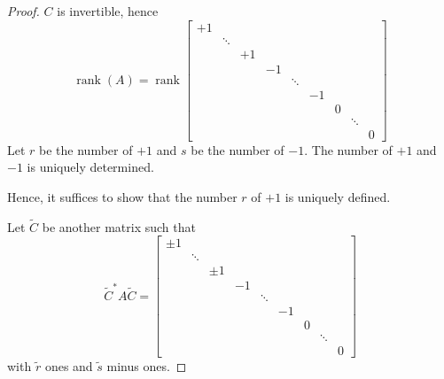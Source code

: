 \documentclass{article}
\begin{document}
\begin{proof}
  $C$ is invertible, hence
  \[
    \operatorname{rank}(A) =
    \operatorname{rank} \begin{bmatrix}
       +1 &        &       &    &        &    &   &        & \\
          & \ddots &       &    &        &    &   &        & \\
          &        &    +1 &    &        &    &   &        & \\
          &        &       & -1 &        &    &   &        & \\
          &        &       &    & \ddots &    &   &        & \\
          &        &       &    &        & -1 &   &        & \\
          &        &       &    &        &    & 0 &        & \\
          &        &       &    &        &    &   & \ddots & \\
          &        &       &    &        &    &   &        & 0
    \end{bmatrix}
  \]
  Let $r$ be the number of $+1$ and $s$ be the number of $-1$.
  The number of $+1$ and $-1$ is uniquely determined.

  Hence, it suffices to show that the number $r$ of $+1$ is uniquely defined.

  Let $\tilde{C}$ be another matrix such that
  \[ \tilde C^* A \tilde C = \begin{bmatrix}
    \pm 1 &        &       &    &        &    &   &        & \\
          & \ddots &       &    &        &    &   &        & \\
          &        & \pm 1 &    &        &    &   &        & \\
          &        &       & -1 &        &    &   &        & \\
          &        &       &    & \ddots &    &   &        & \\
          &        &       &    &        & -1 &   &        & \\
          &        &       &    &        &    & 0 &        & \\
          &        &       &    &        &    &   & \ddots & \\
          &        &       &    &        &    &   &        & 0
    \end{bmatrix}
  \]
  with $\tilde r$ ones and $\tilde s$ minus ones.


\end{proof}
\end{document}
